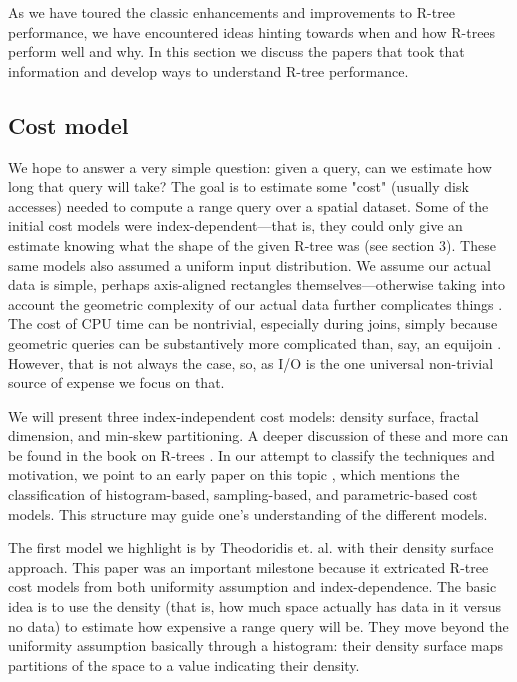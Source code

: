 As we have toured the classic enhancements and improvements to R-tree performance, we have encountered ideas hinting towards when and how R-trees perform well and why.
In this section we discuss the papers that took that information and develop ways to understand R-tree performance.

\subsection{Cost model}
We hope to answer a very simple question: given a query, can we estimate how long that query will take?
The goal is to estimate some "cost" (usually disk accesses) needed to compute a range query over a spatial dataset.
Some of the initial cost models were index-dependent---that is, they could only give an estimate knowing what the shape of the given R-tree was \cite{theodoridisstefanakissellis00} (see section 3).
These same models also assumed a uniform input distribution.
We assume our actual data is simple, perhaps axis-aligned rectangles themselves---otherwise taking into account the geometric complexity of our actual data further complicates things \cite{aboulnaganaughton00}.
The cost of CPU time can be nontrivial, especially during joins, simply because geometric queries can be substantively more complicated than, say, an equijoin \cite{theodoridisstefanakissellis00}.
However, that is not always the case, so, as I/O is the one universal non-trivial source of expense we focus on that.

We will present three index-independent cost models: density surface, fractal dimension, and min-skew partitioning.
A deeper discussion of these and more can be found in the book on R-trees \cite{thebook}.
In our attempt to classify the techniques and motivation, we point to an early paper on this topic \cite{acharyapoosalaramaswamy99}, which mentions the classification of histogram-based, sampling-based, and parametric-based cost models. This structure may guide one's understanding of the different models.

The first model we highlight is by Theodoridis et. al. \cite{theodoridissellis96,theodoridisstefanakissellis00} with their density surface approach.
This paper was an important milestone because it extricated R-tree cost models from both uniformity assumption and index-dependence.
The basic idea is to use the density (that is, how much space actually has data in it versus no data) to estimate how expensive a range query will be.
They move beyond the uniformity assumption basically through a histogram: their density surface maps partitions of the space to a value indicating their density.

